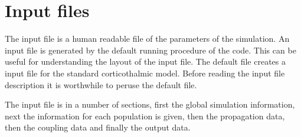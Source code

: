 \documentclass[12pt,a4paper]{article}
\begin{document}
\section{Input files}

The input file is a human readable file of the parameters of the simulation.
An input file is generated by the default running procedure of the code. This can be
useful for understanding the layout of the input file. The default file
creates a input file for the standard corticothalmic model. Before
reading the input file description it is worthwhile to 
peruse the default file.

The input file is in a number of sections, first the global simulation information,
next the information for each population is given, then the propagation data,
then the coupling data and finally the output data.
\end{document}

